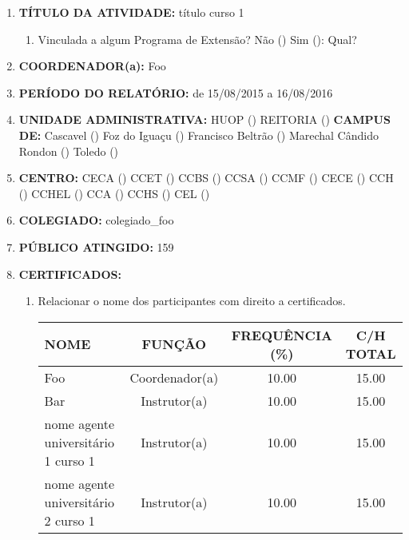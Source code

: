 \documentclass[12pt,a4paper,oneside,brazil]{article}%
\begin{document}
\begin{enumerate}%
\footnotesize%
\item%
\textbf{TÍTULO DA ATIVIDADE: }%
título curso 1%
\begin{enumerate}%
\item%
Vinculada a algum Programa de Extensão? %
Não () Sim (): Qual? %
\end{enumerate}%
\item%
\textbf{COORDENADOR(a): }%
Foo%
\item%
\textbf{PERÍODO DO RELATÓRIO: }%
de 15/08/2015 a 16/08/2016%
\item%
\textbf{UNIDADE ADMINISTRATIVA: }%
HUOP () %
REITORIA () %
\newline%
\textbf{CAMPUS DE: }%
Cascavel () %
Foz do Iguaçu () %
Francisco Beltrão () %
Marechal Cândido Rondon () %
Toledo () %
\item%
\textbf{CENTRO: }%
\newline%
CECA () %
CCET () %
CCBS () %
CCSA () %
CCMF () %
CECE () %
CCH () %
CCHEL () %
CCA () %
CCHS () %
CEL () %
\item%
\textbf{COLEGIADO: }%
colegiado\_foo%
\item%
\textbf{PÚBLICO ATINGIDO: }%
159%
\item%
\textbf{CERTIFICADOS: }%
\begin{enumerate}%
\item%
Relacionar o nome dos participantes com direito a certificados.%
\newline%
\begin{tabularx}{\linewidth}{|>{\centering\arraybackslash}X|
                                  @{    }c@{    }|
                                  @{    }c@{    }|
                                  @{    }c@{    }|
                              }%
\hline%
NOME&FUNÇÃO&FREQUÊNCIA (\%)&C/H TOTAL\\%
\hline%
Foo&Coordenador(a)&10.00&15.00\\%
\hline%
Bar&Instrutor(a)&10.00&15.00\\%
\hline%
nome agente universitário 1 curso 1&Instrutor(a)&10.00&15.00\\%
\hline%
nome agente universitário 2 curso 1&Instrutor(a)&10.00&15.00\\%

\end{tabularx}
\end{enumerate}
\end{enumerate}
\end{document}
